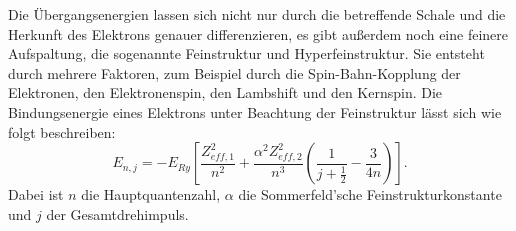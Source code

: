 Die Übergangsenergien lassen sich nicht nur durch die betreffende Schale und die Herkunft des Elektrons genauer differenzieren, es gibt außerdem noch eine feinere Aufspaltung, die sogenannte Feinstruktur und Hyperfeinstruktur.
Sie entsteht durch mehrere Faktoren, zum Beispiel durch die Spin-Bahn-Kopplung der Elektronen, den Elektronenspin, den Lambshift und den Kernspin.
Die Bindungsenergie eines Elektrons unter Beachtung der Feinstruktur lässt sich wie folgt beschreiben:
\begin{equation*}
  E_{n, j}=- E_{Ry} \left[\frac{Z_{eff, 1}^2}{n^2}+\frac{\alpha^2 Z_{eff, 2}^2}{n^3}\left( \frac{1}{j+\frac{1}{2}} - \frac{3}{4n} \right) \right].
\end{equation*}
Dabei ist $n$ die Hauptquantenzahl, $\alpha$ die Sommerfeld'sche Feinstrukturkonstante und $j$ der Gesamtdrehimpuls.
\FloatBarrier
